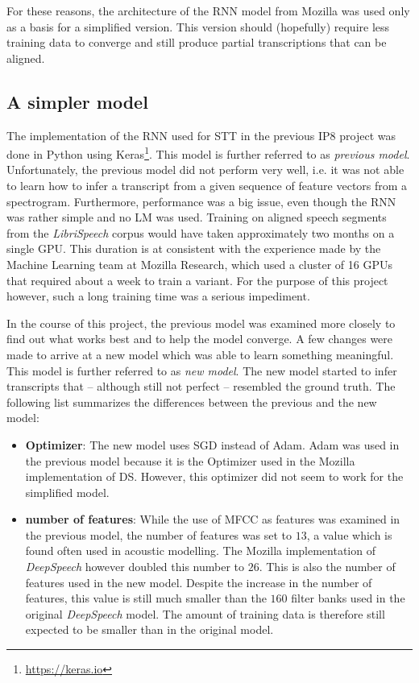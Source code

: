 For these reasons, the architecture of the \ac{RNN} model from Mozilla was used only as a basis for a simplified version. This version should (hopefully) require less training data to converge and still produce partial transcriptions that can be aligned.

\subsection{A simpler model}

The implementation of the \ac{RNN} used for \ac{STT} in the previous IP8 project was done in Python using Keras\footnote{\url{https://keras.io}}. This model is further referred to as \textit{previous model}. Unfortunately, the previous model did not perform very well, i.e. it was not able to learn how to infer a transcript from a given sequence of feature vectors from a spectrogram. Furthermore, performance was a big issue, even though the \ac{RNN} was rather simple and no \ac{LM} was used. Training on aligned speech segments from the \textit{LibriSpeech} corpus would have taken approximately two months on a single \ac{GPU}. This duration is at consistent with the experience made by the Machine Learning team at Mozilla Research, which used a cluster of 16 \acsp{GPU} that required about a week \parencite{mozillajourney} to train a variant. For the purpose of this project however, such a long training time was a serious impediment.

In the course of this project, the previous model was examined more closely to find out what works best and to help the model converge. A few changes were made to arrive at a new model which was able to learn something meaningful. This model is further referred to as \textit{new model}. The new model started to infer transcripts that -- although still not perfect -- resembled the ground truth. The following list summarizes the differences between the previous and the new model:

\begin{itemize}
	\item \textbf{Optimizer}: The new model uses \ac{SGD} instead of Adam. Adam was used in the previous model because it is the Optimizer used in the Mozilla implementation of \ac{DS}. However, this optimizer did not seem to work for the simplified model.
	\item \textbf{number of features}: While the use of \ac{MFCC} as features was examined in the previous model, the number of features was set to $13$, a value which is found often used in acoustic modelling. The Mozilla implementation of \textit{DeepSpeech} however doubled this number to $26$. This is also the number of features used in the new model. Despite the increase in the number of features, this value is still much smaller than the $160$ filter banks used in the original \textit{DeepSpeech} model. The amount of training data is therefore still expected to be smaller than in the original model.
\end{itemize}

